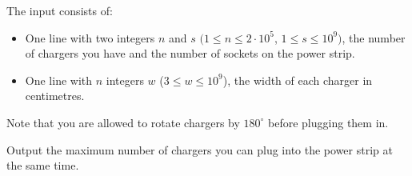 \begin{Input}
The input consists of:
\begin{itemize}
\item
One line with two integers $n$ and $s$ $(1\leq n\leq2\cdot 10^5$,  $1\leq s\leq10^9)$, the number of chargers you have and the number of sockets on the power strip.
\item
One line with $n$ integers $w$ ($3\leq w\leq10^9$),
the width of each charger in centimetres.
\end{itemize}
Note that you are allowed to rotate chargers by $180^\circ$ before plugging them in.
\end{Input}

\begin{Output}
Output the maximum number of chargers you can plug into the power strip at the same time.
\end{Output}
